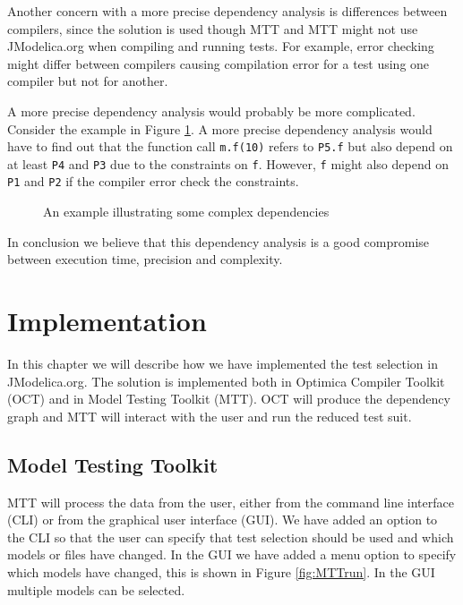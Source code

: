 \documentclass{cslthse-msc}
\begin{document}
Another concern with a more precise dependency analysis is differences between compilers, since the solution is used though MTT and MTT might not use JModelica.org when compiling and running tests. For example, error checking might differ between compilers causing compilation error for a test using one compiler but not for another.

A more precise dependency analysis would probably be more complicated. Consider the example in Figure \ref{fig:contrainedBy}. A more precise dependency analysis would have to find out that the function call \texttt{m.f(10)} refers to \texttt{P5.f} but also depend on at least \texttt{P4} and \texttt{P3} due to the constraints on \texttt{f}. However, \texttt{f} might also depend on \texttt{P1} and \texttt{P2} if the compiler error check the constraints. 

\begin{figure}[htbp]
    \centering
    \raisebox{4.0 cm}{}
    \caption{An example illustrating some complex dependencies}
    \label{fig:contrainedBy}
\end{figure}

In conclusion we believe that this dependency analysis is a good compromise between execution time, precision and complexity.


\chapter[Implementation]{Implementation}
In this chapter we will describe how we have implemented the test selection in JModelica.org. The solution is implemented both in Optimica Compiler Toolkit (OCT) and in Model Testing Toolkit (MTT). OCT will produce the dependency graph and MTT will interact with the user and run the reduced test suit.

\section{Model Testing Toolkit}

MTT will process the data from the user, either from the command line interface (CLI) or from the graphical user interface (GUI). We have added an option to the CLI so that the user can specify that test selection should be used and which models or files have changed. In the GUI we have added a menu option to specify which models have changed, this is shown in Figure \ref{fig:MTTrun}. In the GUI multiple models can be selected.
\end{document}
